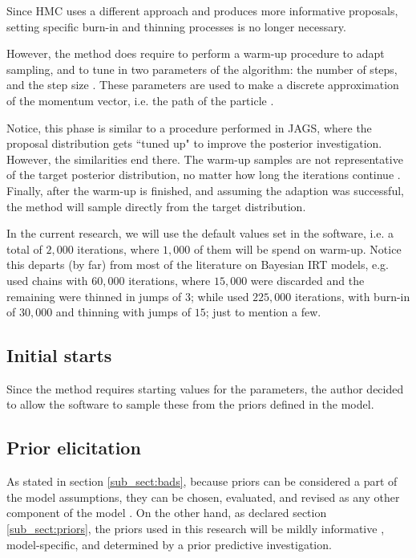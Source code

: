 Since HMC uses a different approach and produces more informative proposals, setting specific burn-in and thinning processes is no longer necessary.

However, the method does require to perform a warm-up procedure to adapt sampling, and to tune in two parameters of the algorithm: the number of steps, and the step size \cite{Stan2020}. These parameters are used to make a discrete approximation of the momentum vector, i.e. the path of the particle \cite{Neal_2011, Betancourt_et_al_2013}. 

Notice, this phase is similar to a procedure performed in JAGS, where the proposal distribution gets ``tuned up" to improve the posterior investigation. However, the similarities end there. The warm-up samples are not representative of the target posterior distribution, no matter how long the iterations continue \cite{McElreath_2020}. Finally, after the warm-up is finished, and assuming the adaption was successful, the method will sample directly from the target distribution.

In the current research, we will use the default values set in the software, i.e. a total of $2,000$ iterations, where $1,000$ of them will be spend on warm-up. Notice this departs (by far) from most of the literature on Bayesian IRT models, e.g. \citet{Fujimoto_2018a} used chains with $60,000$ iterations, where $15,000$ were discarded and the remaining were thinned in jumps of $3$; while \citet{Fujimoto_2018b} used $225,000$ iterations, with burn-in of $30,000$ and thinning with jumps of $15$; just to mention a few.



\subsection{Initial starts} \label{sub_sect:starts}

Since the method requires starting values for the parameters, the author decided to allow the software to sample these from the priors defined in the model.



\subsection{Prior elicitation} \label{sub_sect:prior_pred}

As stated in section \ref{sub_sect:bads}, because priors can be considered a part of the model assumptions, they can be chosen, evaluated, and revised as any other component of the model \cite{McElreath_2020}. On the other hand, as declared section \ref{sub_sect:priors}, the priors used in this research will be mildly informative \cite{McElreath_2020, Fujimoto_2020, Tarazona_2013, Jiao_et_al_2012, Azevedo_2003, Wollack_2002}, model-specific, and determined by a prior predictive investigation.

